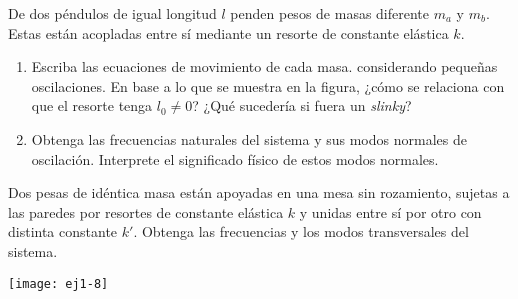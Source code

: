 \item \label{pendacop}
\begin{minipage}[t][4cm]{0.75\textwidth}
De dos péndulos de igual longitud $l$ penden pesos de masas diferente $m_a$ y $m_b$.
Estas están acopladas entre sí mediante un resorte de constante elástica $k$.
\begin{enumerate}
	\item Escriba las ecuaciones de movimiento de cada masa. considerando pequeñas oscilaciones.
	En base a lo que se muestra en la figura, ¿cómo se relaciona con que el resorte tenga $l_0 \neq 0$?
	¿Qué sucedería si fuera un \emph{slinky}?   
	\item Obtenga las frecuencias naturales del sistema y sus modos normales de oscilación.
	Interprete el significado físico de estos modos normales. 
\end{enumerate}
\end{minipage}
\begin{minipage}[c][0cm][t]{0.2\textwidth}
	\begingroup
		
	\endgroup
\end{minipage}



\item \label{2masitas}
\begin{minipage}[t][2cm]{0.65\textwidth}
Dos pesas de idéntica masa están apoyadas en una mesa sin rozamiento, sujetas a las paredes por resortes de constante
elástica $k$ y unidas entre sí por otro con distinta constante $k'$.
Obtenga las frecuencias y los modos transversales del sistema. 
\end{minipage}
\begin{minipage}[c][0.5cm][t]{0.3\textwidth}
  \texttt{[image: ej1-8]}
\end{minipage}
